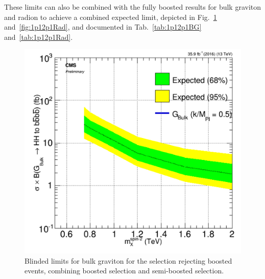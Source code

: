 These limits can also be combined with the fully boosted results for bulk graviton and radion to achieve a combined expected limit, depicted in Fig.~\ref{fig:1p12p1BG} and~\ref{fig:1p12p1Rad}, and documented in Tab.~\ref{tab:1p12p1BG} and~\ref{tab:1p12p1Rad}.

\begin{figure}[thb!]
\begin{center}
\includegraphics[scale=0.5]{Figures/brazflag_BG_comb_v2.pdf}
\end{center}
\caption{Blinded limits for bulk graviton for the selection rejecting boosted events, combining boosted selection and semi-boosted selection.}
\label{fig:1p12p1BG}
\end{figure} 

